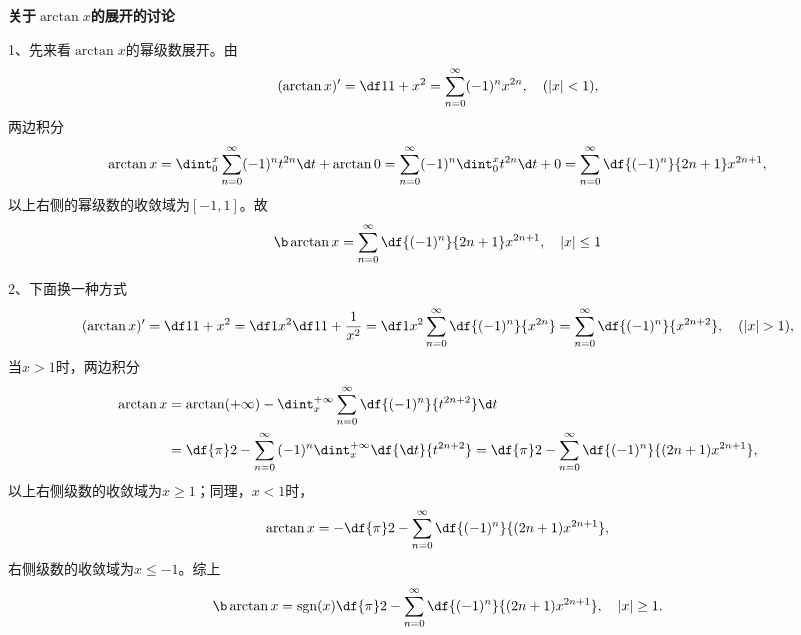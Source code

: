\begin{shaded}
	{\bf 关于$\arctan x$的展开的讨论}
	
	1、先来看$\arctan x$的幂级数展开。由
	$$(\arctan x)'=\df1{1+x^2}
	=\sum\limits_{n=0}^{\infty}(-1)^nx^{2n}, \quad (|x|<1),$$
	两边积分
	$$\arctan x=\dint_0^x\sum\limits_{n=0}^{\infty}(-1)^nt^{2n}\d t
	+\arctan 0
	=\sum\limits_{n=0}^{\infty}(-1)^n\dint_0^xt^{2n}\d t+0
	=\sum\limits_{n=0}^{\infty}\df{(-1)^n}{2n+1}x^{2n+1},$$
	以上右侧的幂级数的收敛域为$[-1,1]$。故
	$${\b\arctan x=\sum\limits_{n=0}^{\infty}\df{(-1)^n}{2n+1}x^{2n+1},
	\quad |x|\leq1}$$
	
	\begin{center}
	\end{center}
	
	2、下面换一种方式
	$$(\arctan x)'=\df1{1+x^2}=\df1{x^2}\df1{1+\frac1{x^2}}
	=\df1{x^2}\sum\limits_{n=0}^{\infty}\df{(-1)^n}{x^{2n}}
	=\sum\limits_{n=0}^{\infty}\df{(-1)^n}{x^{2n+2}}, \quad (|x|>1),$$
	当$x>1$时，两边积分
	\begin{align*}
	\arctan x&=\arctan(+\infty)-
	\dint_x^{+\infty}\sum\limits_{n=0}^{\infty}\df{(-1)^n}{t^{2n+2}}\d t\\
	&=\df{\pi}2-\sum\limits_{n=0}^{\infty}{(-1)^n}\dint_x^{+\infty}\df{\d
	t}{t^{2n+2}} =\df{\pi}2-\sum\limits_{n=0}^{\infty}\df{(-1)^{n}}{(2n+1)x^{2n+1}},
	\end{align*}
	以上右侧级数的收敛域为$x\geq 1$；同理，$x<1$时，
	$$\arctan x=-\df{\pi}2
	-\sum\limits_{n=0}^{\infty}\df{(-1)^{n}}{(2n+1)x^{2n+1}},$$
	右侧级数的收敛域为$x\leq -1$。综上
	$${\b\arctan x=\mathrm{sgn}(x)\df{\pi}2-\sum\limits_{n=0}^{\infty}
	\df{(-1)^{n}}{(2n+1)x^{2n+1}},\quad |x|\geq1.}$$
	

\end{shaded}

